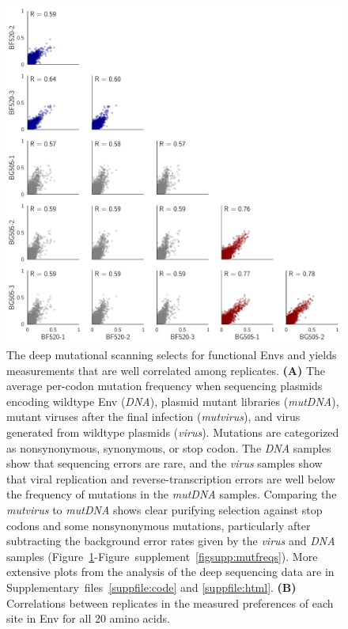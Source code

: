 \documentclass[9pt]{elife}
\begin{document}
\begin{figure}
\begin{minipage}[t]{0.65\textwidth}
\includegraphics[width=\textwidth]{figures/allprefscorr.pdf}
\end{minipage}
\caption{\label{fig:mutfreqs}
The deep mutational scanning selects for functional Envs and yields measurements that are well correlated among replicates.
{\bf (A)}
The average per-codon mutation frequency when sequencing plasmids encoding wildtype Env (\emph{DNA}), plasmid mutant libraries (\emph{mutDNA}), mutant viruses after the final infection (\emph{mutvirus}), and virus generated from wildtype plasmids (\emph{virus}).
Mutations are categorized as nonsynonymous, synonymous, or stop codon. 
The \emph{DNA} samples show that sequencing errors are rare, and the \emph{virus} samples show that viral replication and reverse-transcription errors are well below the frequency of mutations in the \emph{mutDNA} samples.
Comparing the \emph{mutvirus} to \emph{mutDNA} shows clear purifying selection against stop codons and some nonsynonymous mutations, particularly after subtracting the background error rates given by the \emph{virus} and \emph{DNA} samples (Figure~\ref{fig:mutfreqs}-Figure~supplement~\ref{figsupp:mutfreqs}).
More extensive plots from the analysis of the deep sequencing data are in Supplementary~files~\ref{suppfile:code} and \ref{suppfile:html}.
{\bf (B)}
Correlations between replicates in the measured preferences of each site in Env for all 20 amino acids.
}
\end{figure}
\end{document}
